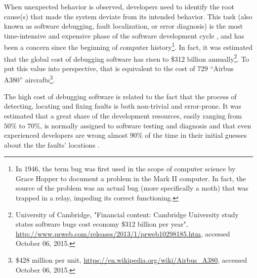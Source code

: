 When unexpected behavior is observed, developers need to identify the
root cause(s) that made the system deviate from its intended behavior.
%
This task (also known as software debugging, fault localization, or
error diagnosis) is the most time-intensive and expensive phase of the
software development cycle \cite{Hailpern02}, and has been a concern
since the beginning of computer history\footnote{In 1946, the term bug
  was first used in the scope of computer science by Grace Hopper to
  document a problem in the Mark II computer.  In fact, the source of
  the problem was an actual bug (more specifically a moth) that was
  trapped in a relay, impeding its correct functioning.}.
%
In fact, it was estimated that the global cost of debugging software
has risen to \$312 billion annually\footnote{ University of
  Cambridge, "Financial content: Cambridge University study states
  software bugs cost economy \$312 billion per year",
  \url{http://www.prweb.com/releases/2013/1/prweb10298185.htm},
  accessed October 06, 2015.}.
%
To put this value into perspective, that is equivalent to the cost of
$729$ ``Airbus A380'' aircrafts\footnote{\$428 million per unit,
  \url{https://en.wikipedia.org/wiki/Airbus_A380}, accessed October
  06, 2015.}.

The high cost of debugging software is related to the fact that the
process of detecting, locating and fixing faults is both non-trivial
and error-prone.
%
It was estimated that a great share of the development resources,
easily ranging from $50\%$ to $70\%$, is normally assigned to software
testing and diagnosis \cite{Hailpern02} and that even experienced
developers are wrong almost $90\%$ of the time in their initial
guesses about the the faults' locations \cite{Ko08}.


